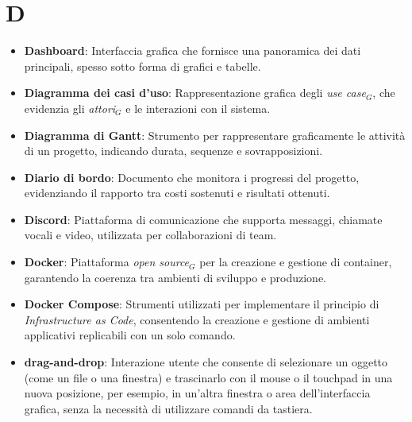 \section{D}
\begin{itemize}
    \item \textbf{Dashboard}: Interfaccia grafica che fornisce una panoramica dei dati principali, spesso sotto forma di grafici e tabelle.
    \item \textbf{Diagramma dei casi d’uso}: Rappresentazione grafica degli \textit{use case}$_G$, che evidenzia gli \textit{attori}$_G$ e le interazioni con il sistema.
    \item \textbf{Diagramma di Gantt}: Strumento per rappresentare graficamente le attività di un progetto, indicando durata, sequenze e sovrapposizioni.
    \item \textbf{Diario di bordo}: Documento che monitora i progressi del progetto, evidenziando il rapporto tra costi sostenuti e risultati ottenuti.
    \item \textbf{Discord}: Piattaforma di comunicazione che supporta messaggi, chiamate vocali e video, utilizzata per collaborazioni di team.
    \item \textbf{Docker}: Piattaforma \textit{open source}$_G$ per la creazione e gestione di container, garantendo la coerenza tra ambienti di sviluppo e produzione.
    \item \textbf{Docker Compose}: Strumenti utilizzati per implementare il principio di \textit{Infrastructure as Code}, consentendo la creazione e gestione di ambienti applicativi replicabili con un solo comando.
    \item \textbf{drag-and-drop}: Interazione utente che consente di selezionare un oggetto (come un file o una finestra) e trascinarlo con il mouse o il touchpad in una nuova posizione, per esempio, in un'altra finestra o area dell'interfaccia grafica, senza la necessità di utilizzare comandi da tastiera.

\end{itemize}
